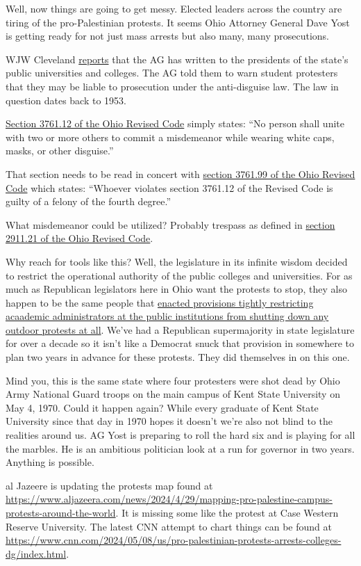 Well, now things are going to get messy. Elected leaders across the
country are tiring of the pro-Palestinian protests. It seems Ohio
Attorney General Dave Yost is getting ready for not just mass arrests
but also many, many prosecutions.

WJW Cleveland
\href{https://web.archive.org/web/20240508235750/https://fox8.com/news/ohio-ag-anti-kkk-charges-for-student-protestors-in-masks/}{reports}
that the AG has written to the presidents of the state's public
universities and colleges. The AG told them to warn student protesters
that they may be liable to prosecution under the anti-disguise law. The
law in question dates back to 1953.

\href{https://codes.ohio.gov/ohio-revised-code/section-3761.12}{Section
3761.12 of the Ohio Revised Code} simply states: ``No person shall unite
with two or more others to commit a misdemeanor while wearing white
caps, masks, or other disguise.''

That section needs to be read in concert with
\href{https://codes.ohio.gov/ohio-revised-code/section-3761.99}{section
3761.99 of the Ohio Revised Code} which states: ``Whoever violates
section 3761.12 of the Revised Code is guilty of a felony of the fourth
degree.''

What misdemeanor could be utilized? Probably trespass as defined in
\href{https://codes.ohio.gov/ohio-revised-code/section-2911.21}{section
2911.21 of the Ohio Revised Code}.

Why reach for tools like this? Well, the legislature in its infinite
wisdom decided to restrict the operational authority of the public
colleges and universities. For as much as Republican legislators here in
Ohio want the protests to stop, they also happen to be the same people
that
\href{https://codes.ohio.gov/ohio-revised-code/section-3345.0213}{enacted
provisions tightly restricting acaademic administrators at the public
institutions from shutting down any outdoor protests at all}. We've had
a Republican supermajority in state legislature for over a decade so it
isn't like a Democrat snuck that provision in somewhere to plan two
years in advance for these protests. They did themselves in on this one.

Mind you, this is the same state where four protesters were shot dead by
Ohio Army National Guard troops on the main campus of Kent State
University on May 4, 1970. Could it happen again? While every graduate
of Kent State University since that day in 1970 hopes it doesn't we're
also not blind to the realities around us. AG Yost is preparing to roll
the hard six and is playing for all the marbles. He is an ambitious
politician look at a run for governor in two years. Anything is
possible.

al Jazeere is updating the protests map found at
\url{https://www.aljazeera.com/news/2024/4/29/mapping-pro-palestine-campus-protests-around-the-world}.
It is missing some like the protest at Case Western Reserve University.
The latest CNN attempt to chart things can be found at
\url{https://www.cnn.com/2024/05/08/us/pro-palestinian-protests-arrests-colleges-dg/index.html}.
